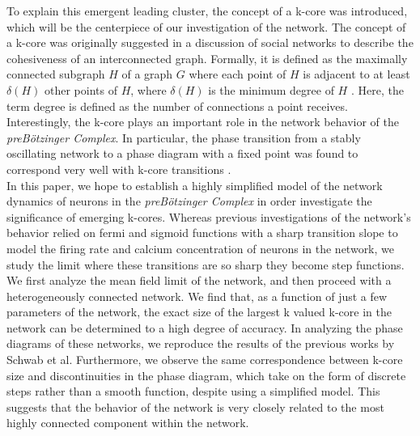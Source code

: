 \documentclass[11pt,letterpaper]{article}
\begin{document}
To explain this emergent leading cluster, the concept of a k-core was introduced, which will be the centerpiece of our investigation of the network. The concept of a k-core was originally suggested in a discussion of social networks to describe the cohesiveness of an interconnected graph. Formally, it is defined as the maximally connected subgraph $H$ of a graph $G$ where each point of $H$ is adjacent to at least $\delta (H)$ other points of $H$, where $\delta (H)$ is the minimum degree of $H$ \cite{network_structure_minimum_degree}. Here, the term degree is defined as the number of connections a point receives. Interestingly, the k-core plays an important role in the network behavior of the \textit{preB{\"o}tzinger Complex}. In particular, the phase transition from a stably oscillating network to a phase diagram with a fixed point was found to correspond very well with k-core transitions \cite{kcore_paper}.\\

In this paper, we hope to establish a highly simplified model of the network dynamics of neurons in the \textit{preB{\"o}tzinger Complex} in order investigate the significance of emerging k-cores. Whereas previous investigations of the network's behavior relied on fermi and sigmoid functions with a sharp transition \cite{kcore_paper} slope to model the firing rate and calcium concentration of neurons in the network, we study the limit where these transitions are so sharp they become step functions. We first analyze the mean field limit of the network, and then proceed with a heterogeneously connected network. We find that, as a function of just a few parameters of the network, the exact size of the largest k valued k-core in the network can be determined to a high degree of accuracy. In analyzing the phase diagrams of these networks, we reproduce the results of the previous works by Schwab et al. Furthermore, we observe the same correspondence between k-core size and discontinuities in the phase diagram, which take on the form of discrete steps rather than a smooth function, despite using a simplified model. This suggests that the behavior of the network is very closely related to the most highly connected component within the network.\\

\end{document}
